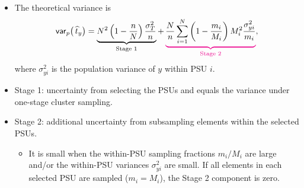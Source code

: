 \documentclass{my_eth_beamer}
\numberwithin{equation}{section}
\begin{document}
\begin{frame}
    \begin{itemize}
    \setlength{\itemsep}{6pt}
        \item The \alert{theoretical} variance is
            \begin{equation*}
                \mathsf{var}_p\big(\,\widehat{t}_y\big) =
                    \underbrace{N^2 \left(1 - \frac{n}{N}\right)
                        \frac{\sigma_{T}^{2}}{n}}_{\text{Stage 1}} +
                    \color{magenta}\underbrace{\color{black}\frac{N}{n}
                        \sum_{i = 1}^{N}
                        \left(1 - \frac{m_i}{M_i}\right) M_i^2
                        \frac{\sigma_{yi}^2}{m_i}}_
                        {\text{\color{magenta} Stage 2}}\color{black},
            \end{equation*}
            where $\sigma_{yi}^2$ is the population variance of $y$ within
            PSU $i$.
        \item \alert{Stage 1:} uncertainty from selecting the PSUs and
            equals the variance under one-stage cluster
                    sampling.
        \item \alert{Stage 2:} additional uncertainty from subsampling
            elements within the selected PSUs.
            \vspace{0.25em}
            \begin{itemize}
            \setlength{\itemsep}{8pt}
                \item[\goto] It is small when the
                    within-PSU sampling fractions $m_i/M_i$ are large and/or
                    the within-PSU variances $\sigma_{yi}^2$ are small.
                    If all elements in each selected PSU are sampled
                    ($m_i=M_i$), the Stage 2 component is zero.
            \end{itemize}
    \end{itemize}
\end{frame}
\end{document}
